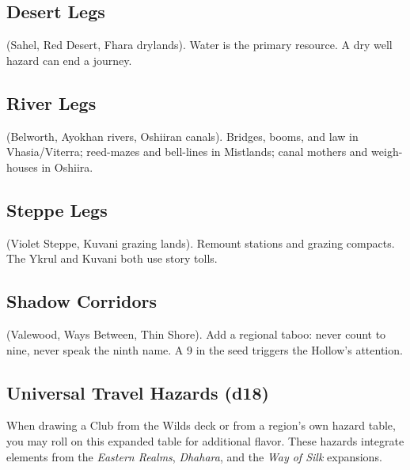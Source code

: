 \documentclass[11pt,letterpaper,twoside]{book}
\begin{document}
\subsection{Desert Legs}
(Sahel, Red Desert, Fhara drylands). Water is the primary resource. A dry well hazard can end a journey.

\subsection{River Legs}
(Belworth, Ayokhan rivers, Oshiiran canals). Bridges, booms, and law in Vhasia/Viterra; reed-mazes and bell-lines in Mistlands; canal mothers and weigh-houses in Oshiira.

\subsection{Steppe Legs}
(Violet Steppe, Kuvani grazing lands). Remount stations and grazing compacts. The Ykrul and Kuvani both use story tolls.

\subsection{Shadow Corridors}
(Valewood, Ways Between, Thin Shore). Add a regional taboo: never count to nine, never speak the ninth name. A 9 in the seed triggers the Hollow's attention.

\newpage

\subsection{Universal Travel Hazards (d18)}
When drawing a Club from the Wilds deck or from a region's own hazard table, you may roll on this expanded table for additional flavor. These hazards integrate elements from the \emph{Eastern Realms}, \emph{Dhahara}, and the \emph{Way of Silk} expansions.
\end{document}
